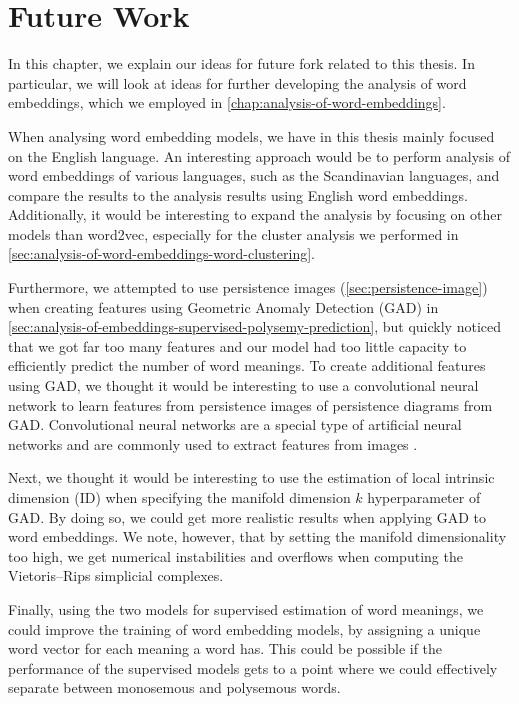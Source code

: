 \chapter{Future Work}
\label{chap:future-work}
In this chapter, we explain our ideas for future fork related to this thesis. In particular, we will look at ideas for further developing the analysis of word embeddings, which we employed in \cref{chap:analysis-of-word-embeddings}.

When analysing word embedding models, we have in this thesis mainly focused on the English language. An interesting approach would be to perform analysis of word embeddings of various languages, such as the Scandinavian languages, and compare the results to the analysis results using English word embeddings. Additionally, it would be interesting to expand the analysis by focusing on other models than word2vec, especially for the cluster analysis we performed in \cref{sec:analysis-of-word-embeddings-word-clustering}.

Furthermore, we attempted to use persistence images (\cref{sec:persistence-image}) when creating features using Geometric Anomaly Detection (GAD) in \cref{sec:analysis-of-embeddings-supervised-polysemy-prediction}, but quickly noticed that we got far too many features and our model had too little capacity to efficiently predict the number of word meanings. To create additional features using GAD, we thought it would be interesting to use a convolutional neural network to learn features from persistence images of persistence diagrams from GAD. Convolutional neural networks are a special type of artificial neural networks and are commonly used to extract features from images \cite[Chapter 8]{Aggarwal18}.

Next, we thought it would be interesting to use the estimation of local intrinsic dimension (ID) when specifying the manifold dimension $k$ hyperparameter of GAD. By doing so, we could get more realistic results when applying GAD to word embeddings. We note, however, that by setting the manifold dimensionality too high, we get numerical instabilities and overflows when computing the Vietoris–Rips simplicial complexes.

Finally, using the two models for supervised estimation of word meanings, we could improve the training of word embedding models, by assigning a unique word vector for each meaning a word has. This could be possible if the performance of the supervised models gets to a point where we could effectively separate between monosemous and polysemous words.